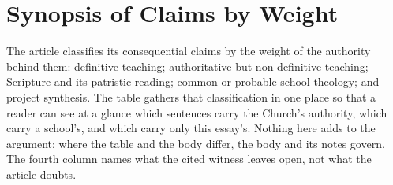 \section{Synopsis of Claims by Weight}

The article classifies its consequential claims by the weight of the authority behind them: definitive teaching; authoritative but non-definitive teaching; Scripture and its patristic reading; common or probable school theology; and project synthesis. The table gathers that classification in one place so that a reader can see at a glance which sentences carry the Church's authority, which carry a school's, and which carry only this essay's. Nothing here adds to the argument; where the table and the body differ, the body and its notes govern. The fourth column names what the cited witness leaves open, not what the article doubts.

